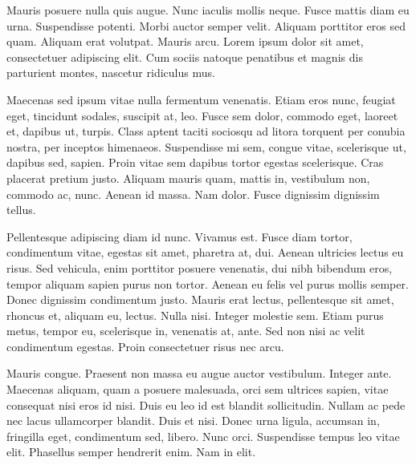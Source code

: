 Mauris posuere nulla quis augue. Nunc iaculis mollis neque. Fusce mattis diam eu urna. Suspendisse potenti. Morbi auctor semper velit. Aliquam porttitor eros sed quam. Aliquam erat volutpat. Mauris arcu. Lorem ipsum dolor sit amet, consectetuer adipiscing elit. Cum sociis natoque penatibus et magnis dis parturient montes, nascetur ridiculus mus.

Maecenas sed ipsum vitae nulla fermentum venenatis. Etiam eros nunc, feugiat eget, tincidunt sodales, suscipit at, leo. Fusce sem dolor, commodo eget, laoreet et, dapibus ut, turpis. Class aptent taciti sociosqu ad litora torquent per conubia nostra, per inceptos himenaeos. Suspendisse mi sem, congue vitae, scelerisque ut, dapibus sed, sapien. Proin vitae sem dapibus tortor egestas scelerisque. Cras placerat pretium justo. Aliquam mauris quam, mattis in, vestibulum non, commodo ac, nunc. Aenean id massa. Nam dolor. Fusce dignissim dignissim tellus.

Pellentesque adipiscing diam id nunc. Vivamus est. Fusce diam tortor, condimentum vitae, egestas sit amet, pharetra at, dui. Aenean ultricies lectus eu risus. Sed vehicula, enim porttitor posuere venenatis, dui nibh bibendum eros, tempor aliquam sapien purus non tortor. Aenean eu felis vel purus mollis semper. Donec dignissim condimentum justo. Mauris erat lectus, pellentesque sit amet, rhoncus et, aliquam eu, lectus. Nulla nisi. Integer molestie sem. Etiam purus metus, tempor eu, scelerisque in, venenatis at, ante. Sed non nisi ac velit condimentum egestas. Proin consectetuer risus nec arcu.

Mauris congue. Praesent non massa eu augue auctor vestibulum. Integer ante. Maecenas aliquam, quam a posuere malesuada, orci sem ultrices sapien, vitae consequat nisi eros id nisi. Duis eu leo id est blandit sollicitudin. Nullam ac pede nec lacus ullamcorper blandit. Duis et nisi. Donec urna ligula, accumsan in, fringilla eget, condimentum sed, libero. Nunc orci. Suspendisse tempus leo vitae elit. Phasellus semper hendrerit enim. Nam in elit.